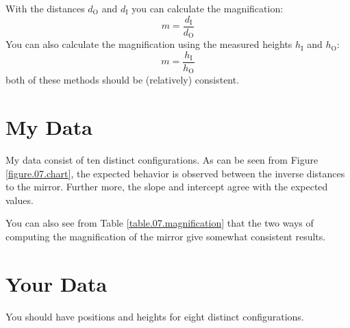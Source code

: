 With the distances $d_{\text{O}}$ and $d_{\text{I}}$ you can calculate the magnification:
\begin{equation}
    m = \frac{d_{\text{I}}}{d_{\text{O}}}
\end{equation}
You can also calculate the magnification using the measured heights $h_{\text{I}}$ and $h_{\text{O}}$:
\begin{equation}
    m = \frac{h_{\text{I}}}{h_{\text{O}}}
\end{equation}
both of these methods should be (relatively) consistent.
%
\section{My Data}
%
My data consist of ten distinct configurations. As can be seen from Figure \ref{figure.07.chart}, the expected behavior is observed between the inverse distances to the mirror. Further more, the slope and intercept agree with the expected values.

You can also see from Table \ref{table.07.magnification} that the two ways of computing the magnification of the mirror give somewhat consistent results.
%
\section{Your Data}
%
You should have positions and heights for eight distinct configurations.
%
%
\newpage
